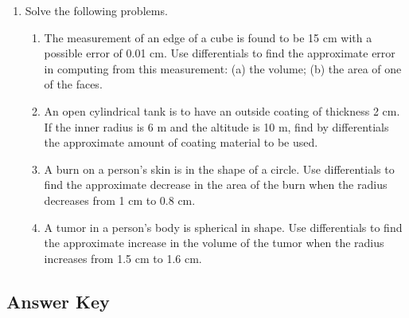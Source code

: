 \documentclass[12pt]{article}
\begin{document}
\begin{enumerate}
        \item Solve the following problems.
        \begin{enumerate}[label*=\arabic*.]
            \item The measurement of an edge of a cube is found to be 15 cm with a possible error of 0.01 cm. Use differentials to find the approximate error in computing from this measurement: (a) the volume; (b) the area of one of the faces.
            \item An open cylindrical tank is to have an outside coating of thickness 2 cm. If the inner radius is 6 m and the altitude is 10 m, find by differentials the approximate amount of coating material to be used.
            \item A burn on a person's skin is in the shape of a circle. Use differentials to find the approximate decrease in the area of the burn when the radius decreases from 1 cm to 0.8 cm.
            \item A tumor in a person's body is spherical in shape. Use differentials to find the approximate increase in the volume of the tumor when the radius increases from 1.5 cm to 1.6 cm.
        \end{enumerate}

    \end{enumerate}

\newpage\subsection*{Answer Key}
\end{document}
